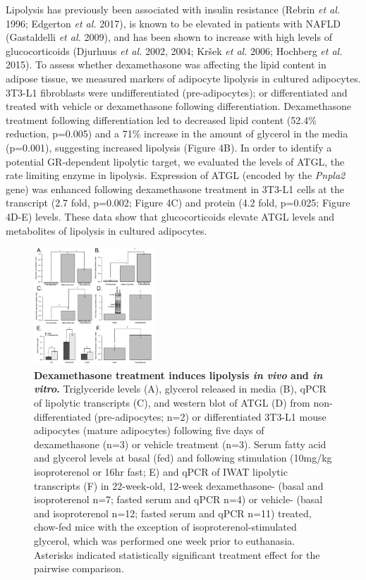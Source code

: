 \documentclass[11pt]{article} %
\begin{document}
Lipolysis has previously been associated with insulin resistance (Rebrin
\emph{et al.} 1996; Edgerton \emph{et al.} 2017), is known to be
elevated in patients with NAFLD (Gastaldelli \emph{et al.} 2009), and
has been shown to increase with high levels of glucocorticoids (Djurhuus
\emph{et al.} 2002, 2004; Kršek \emph{et al.} 2006; Hochberg \emph{et
al.} 2015). To assess whether dexamethasone was affecting the lipid
content in adipose tissue, we measured markers of adipocyte lipolysis in
cultured adipocytes. 3T3-L1 fibroblasts were undifferentiated
(pre-adipocytes); or differentiated and treated with vehicle or
dexamethasone following differentiation. Dexamethasone treatment
following differentiation led to decreased lipid content (52.4\%
reduction, p=0.005) and a 71\% increase in the amount of glycerol in the
media (p=0.001), suggesting increased lipolysis (Figure 4B). In order to
identify a potential GR-dependent lipolytic target, we evaluated the
levels of ATGL, the rate limiting enzyme in lipolysis. Expression of
ATGL (encoded by the \emph{Pnpla2} gene) was enhanced following
dexamethasone treatment in 3T3-L1 cells at the transcript (2.7 fold,
p=0.002; Figure 4C) and protein (4.2 fold, p=0.025; Figure 4D-E) levels.
These data show that glucocorticoids elevate ATGL levels and metabolites
of lipolysis in cultured adipocytes.

\begin{figure}
  \begin{center}
    \includegraphics[width=0.4\textwidth]{Figures_Figure_4.png}
  \end{center}
  \caption{
\textbf{Dexamethasone treatment induces lipolysis \emph{in
vivo} and \emph{in vitro}.}  Triglyceride levels (A), glycerol released in media (B), qPCR of
lipolytic transcripts (C), and western blot of ATGL (D) from
non-differentiated (pre-adipocytes; n=2) or differentiated 3T3-L1 mouse
adipocytes (mature adipocytes) following five days of dexamethasone
(n=3) or vehicle treatment (n=3). Serum fatty acid and glycerol levels
at basal (fed) and following stimulation (10mg/kg isoproterenol or 16hr
fast; E) and qPCR of IWAT lipolytic transcripts (F) in 22-week-old,
12-week dexamethasone- (basal and isoproterenol n=7; fasted serum and
qPCR n=4) or vehicle- (basal and isoproterenol n=12; fasted serum and
qPCR n=11) treated, chow-fed mice with the exception of
isoproterenol-stimulated glycerol, which was performed one week prior to
euthanasia. Asterisks indicated statistically significant treatment
effect for the pairwise comparison.}
 \label{fig:4}
\end{figure}
\end{document}
